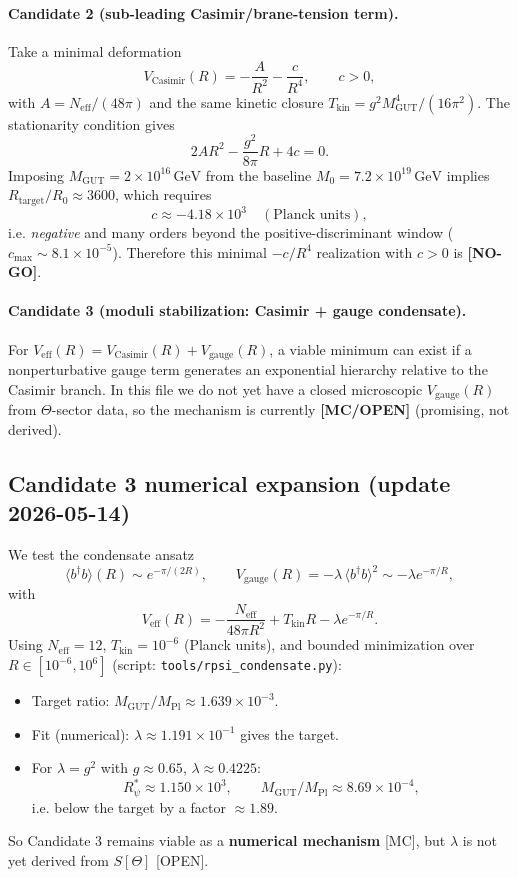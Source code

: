 \documentclass[12pt,a4paper]{article}
\theoremstyle{remark}
\begin{document}
\paragraph{Candidate 2 (sub-leading Casimir/brane-tension term).}
Take a minimal deformation
\[
V_{\mathrm{Casimir}}(R)=-\frac{A}{R^2}-\frac{c}{R^4},\qquad c>0,
\]
with $A=N_{\mathrm{eff}}/(48\pi)$ and the same kinetic closure
\(
T_{\mathrm{kin}}=g^2M_{\mathrm{GUT}}^4/(16\pi^2)
\).
The stationarity condition gives
\[
2AR^2-\frac{g^2}{8\pi}R+4c=0.
\]
Imposing $M_{\mathrm{GUT}}=2\times10^{16}\,\mathrm{GeV}$ from the baseline
$M_0=7.2\times10^{19}\,\mathrm{GeV}$ implies
\(
R_{\mathrm{target}}/R_0\approx3600
\),
which requires
\[
c\approx-4.18\times10^3
\quad(\text{Planck units}),
\]
i.e. \emph{negative} and many orders beyond the positive-discriminant
window ($c_{\max}\sim8.1\times10^{-5}$).  Therefore this minimal
$-c/R^4$ realization with $c>0$ is \textbf{[NO-GO]}.

\paragraph{Candidate 3 (moduli stabilization: Casimir + gauge condensate).}
For
\(
V_{\mathrm{eff}}(R)=V_{\mathrm{Casimir}}(R)+V_{\mathrm{gauge}}(R)
\),
a viable minimum can exist if a nonperturbative gauge term generates an
exponential hierarchy relative to the Casimir branch.  In this file we do not
yet have a closed microscopic $V_{\mathrm{gauge}}(R)$ from $\Theta$-sector data,
so the mechanism is currently \textbf{[MC/OPEN]} (promising, not derived).

\subsection*{Candidate 3 numerical expansion (update 2026-05-14)}

We test the condensate ansatz
\[
\langle b^\dagger b\rangle(R)\sim e^{-\pi/(2R)},
\qquad
V_{\mathrm{gauge}}(R)=-\lambda\,\langle b^\dagger b\rangle^2
\sim -\lambda e^{-\pi/R},
\]
with
\[
V_{\mathrm{eff}}(R)= -\frac{N_{\mathrm{eff}}}{48\pi R^2}+T_{\mathrm{kin}}R-\lambda e^{-\pi/R}.
\]
Using \(N_{\mathrm{eff}}=12\), \(T_{\mathrm{kin}}=10^{-6}\) (Planck units), and
bounded minimization over \(R\in[10^{-6},10^6]\) (script:
\texttt{tools/rpsi\_condensate.py}):
\begin{itemize}
  \item Target ratio: \(M_{\mathrm{GUT}}/M_{\mathrm{Pl}}\approx 1.639\times10^{-3}\).
  \item Fit (numerical): \(\lambda\approx 1.191\times10^{-1}\) gives the target.
  \item For \(\lambda=g^2\) with \(g\approx0.65\), \(\lambda\approx0.4225\):
  \[
  R_\psi^*\approx1.150\times10^3,\qquad
  M_{\mathrm{GUT}}/M_{\mathrm{Pl}}\approx8.69\times10^{-4},
  \]
  i.e. below the target by a factor \(\approx1.89\).
\end{itemize}
So Candidate 3 remains viable as a \textbf{numerical mechanism} [MC], but
\(\lambda\) is not yet derived from \(S[\Theta]\) [OPEN].
\end{document}
